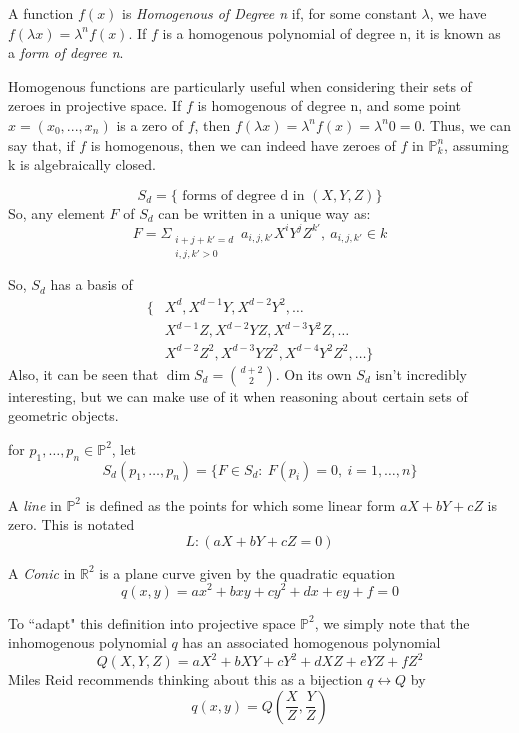 \begin{mydef}
A function $f(x)$ is \emph{Homogenous of Degree n} if, for some 
constant $\lambda$, we have $f(\lambda x) = \lambda ^n f(x)$.
If $f$ is a homogenous polynomial of degree n, it is known as a \emph{form of degree n}.
\end{mydef}

Homogenous functions are particularly useful when considering their
sets of zeroes in projective space. If $f$ is homogenous of degree
n, and some point $x = (x_0, ..., x_n)$ is a zero of $f$, then
$f(\lambda x) = \lambda^n f(x) = \lambda^n 0 = 0$. Thus, we can say
that, if $f$ is homogenous, then we can indeed have zeroes of $f$ in $\mathbb{P}^n_k$,
assuming k is algebraically closed.

\begin{mydef}
\[
S_d = \{\text{ forms of degree d in $(X, Y, Z)$}\}
\]
So, any element $F$ of $S_d$ can be written in a unique way as:
\[
F = \Sigma _{\substack{i+j+k'=d \\ i,j,k' > 0}}~a_{i,j,k'} X^i Y^j Z^{k'},~a_{i,j,k'} \in k
\]
\end{mydef}
So, $S_d$ has a basis of 
\begin{align*}
\{&X^d, X^{d-1}Y, X^{d-2}Y^2, \dots\\
&X^{d-1}Z, X^{d-2}YZ, X^{d-3}Y^2Z, \dots\\
&X^{d-2}Z^2, X^{d-3}YZ^2, X^{d-4}Y^2Z^2, \dots\}
\end{align*}
Also, it can be seen that $\dim S_d = {d+2 \choose 2}$. On its own
$S_d$ isn't incredibly interesting, but we can make use of it when
reasoning about certain sets of geometric objects.

\begin{mydef}
for $p_1, \dots, p_n \in \mathbb{P}^2$, let
\[
	S_d(p_1, \dots, p_n) = \{ F \in S_d :~F(p_i) = 0,~i=1,\dots,n\}
\]
\end{mydef}

\begin{mydef}
A \emph{line} in $\mathbb{P}^2$ is defined as the points for which
some linear form $aX + bY + cZ$ is zero. This is notated
\[
L:(aX+bY+cZ=0)
\]
\end{mydef}

\begin{mydef}
A \emph{Conic} in $\mathbb{R}^2$ is a plane curve given by the quadratic
equation
\[
q(x,y) = ax^2 + bxy + cy^2 + dx + ey + f = 0
\]
\end{mydef}

To ``adapt" this definition into projective space $\mathbb{P}^2$, we simply
note that the inhomogenous polynomial $q$ has an associated
homogenous polynomial 
\[
Q(X,Y,Z) = aX^2 + bXY + cY^2 + dXZ + eYZ + fZ^2
\]
Miles Reid recommends thinking about this as a bijection $q \leftrightarrow Q$ by
\[
q(x,y) = Q(\frac{X}{Z},\frac{Y}{Z})
\]
